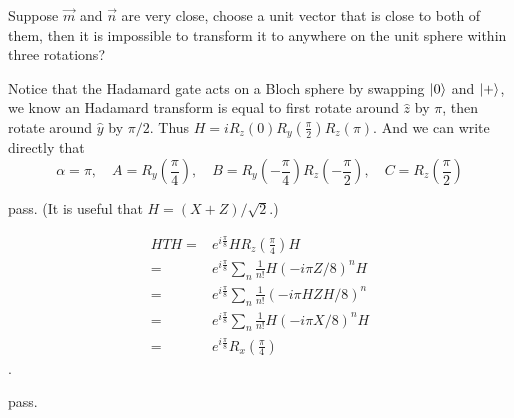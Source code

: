 \ex \redstar  Suppose $\vec{m}$ and $\vec{n}$ are very close, choose a unit vector that is close to both of them, then it is impossible to transform it to anywhere on the unit sphere within three rotations?

\ex Notice that the Hadamard gate acts on a Bloch sphere by swapping $\left|0\right\rangle$ and $\left|+\right\rangle$, we know an Hadamard transform is equal to first rotate around $\hat{z}$ by $\pi$, then rotate around $\hat{y}$ by $\pi/2$.
Thus $H=iR_z(0)R_y(\frac{\pi}{2})R_z(\pi)$.
And we can write directly that
$$\alpha=\pi,\quad A=R_y(\frac{\pi}{4}),\quad B=R_y(-\frac{\pi}{4})R_z(-\frac{\pi}{2}),\quad C=R_z(\frac{\pi}{2})$$

\ex pass. (It is useful that $H=(X+Z)/\sqrt{2}$.)

\ex $$\begin{aligned}HTH=&e^{i\frac{\pi}{8}}HR_z(\frac{\pi}{4})H
    \\=&e^{i\frac{\pi}{8}}\sum_n\frac{1}{n!}H(-i\pi Z/8)^nH
    \\=&e^{i\frac{\pi}{8}}\sum_n\frac{1}{n!}(-i\pi HZH/8)^n
    \\=&e^{i\frac{\pi}{8}}\sum_n\frac{1}{n!}H(-i\pi X/8)^nH
    \\=&e^{i\frac{\pi}{8}}R_x(\frac{\pi}{4})\end{aligned}$$.

\ex pass.

